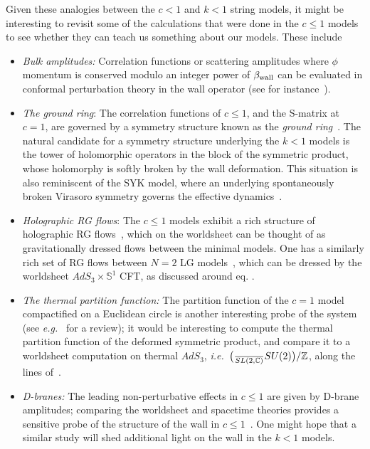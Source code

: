 \documentclass[12pt]{article}
\def\sltwoc{\ensuremath{SL(2,\bC)}}
\def\sutwo{{SU(2)}}
\def\ie{{i.e.}}
\def\eg{{e.g.}}
\newcommand{\bC}{{\mathbb C}}
\newcommand{\bS}{{\mathbb S}}
\newcommand{\bZ}{{\mathbb Z}}
\numberwithin{equation}{section}
\def\ie{{\it i.e.}}
\def\eg{{\it e.g.}}
\def\ie{{\it i.e.}}
\def\eg{{\it e.g.}}
\begin{document}
Given these analogies between the $c<1$ and $k<1$ string models, it might be interesting to revisit some of the calculations that were done in the $c\le1$ models to see whether they can teach us something about our models.  These include
\begin{itemize}
\item
{\it Bulk amplitudes:} Correlation functions or scattering amplitudes where $\phi$ momentum is conserved modulo an integer power of $\beta_{\rm wall}$ can be evaluated in conformal perturbation theory in the wall operator (see for instance~).
\item
{\it The ground ring}:  
The correlation functions of $c\le1$, and the S-matrix at $c=1$, are governed by a symmetry structure known as the {\it ground ring}~.  The natural candidate for a symmetry structure underlying the $k<1$ models is the tower of holomorphic operators in the block of the symmetric product, whose holomorphy is softly broken by the wall deformation.  This situation is also reminiscent of the SYK model, where an underlying spontaneously broken Virasoro symmetry governs the effective dynamics~. 
\item
{\it Holographic RG flows}:
The $c\le1$ models exhibit a rich structure of holographic RG flows~, which on the worldsheet can be thought of as gravitationally dressed flows between the minimal models.  One has a similarly rich set of RG flows between $N=2$ LG models~, which can be dressed by the worldsheet $AdS_3\times\bS^1$ CFT, as discussed around eq. \UVsing. 
\item
{\it The thermal partition function:}
The partition function of the $c=1$ model compactified on a Euclidean circle is another interesting probe of the system (see \eg~ for a review); it would be interesting to compute the thermal partition function of the deformed symmetric product, and compare it to a worldsheet computation on thermal $AdS_3$, \ie\ $\big(\frac\sltwoc\sutwo\big)/\bZ$, along the lines of~.
\item
{\it D-branes:}
The leading non-perturbative effects in $c\le1$ are given by D-brane amplitudes;  comparing the worldsheet and spacetime theories provides a sensitive probe of the structure of the wall in $c\le1$~. One might hope that a similar study will shed additional light on the wall in the $k<1$ models. 
\end{itemize}
\end{document}
